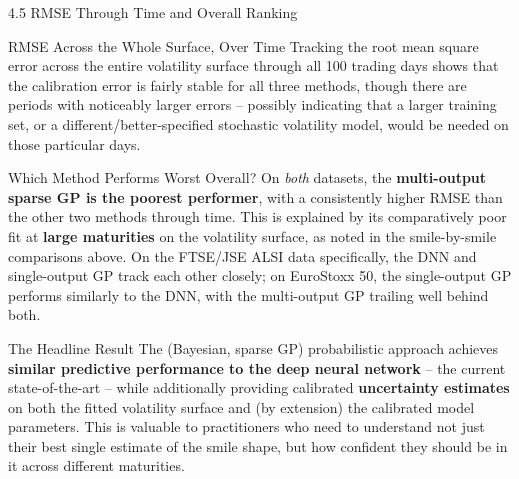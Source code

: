 \documentclass[aspectratio=169,10pt]{beamer}
\begin{document}
\begin{frame}[allowframebreaks]{4.5 RMSE Through Time and Overall Ranking}

\begin{block}{RMSE Across the Whole Surface, Over Time}
Tracking the root mean square error across the entire volatility surface
through all 100 trading days shows that the calibration error is fairly
stable for all three methods, though there are periods with noticeably
larger errors -- possibly indicating that a larger training set, or a
different/better-specified stochastic volatility model, would be needed
on those particular days.
\end{block}

\begin{block}{Which Method Performs Worst Overall?}
On \emph{both} datasets, the \textbf{multi-output sparse GP is the
poorest performer}, with a consistently higher RMSE than the other two
methods through time. This is explained by its comparatively poor fit at
\textbf{large maturities} on the volatility surface, as noted in the
smile-by-smile comparisons above. On the FTSE/JSE ALSI data specifically,
the DNN and single-output GP track each other closely; on EuroStoxx 50,
the single-output GP performs similarly to the DNN, with the multi-output
GP trailing well behind both.
\end{block}

\framebreak

\begin{alertblock}{The Headline Result}
The (Bayesian, sparse GP) probabilistic approach achieves \textbf{similar
predictive performance to the deep neural network} -- the current
state-of-the-art -- while additionally providing calibrated
\textbf{uncertainty estimates} on both the fitted volatility surface and
(by extension) the calibrated model parameters. This is valuable to
practitioners who need to understand not just their best single estimate
of the smile shape, but how confident they should be in it across
different maturities.
\end{alertblock}

\end{frame}
\end{document}

